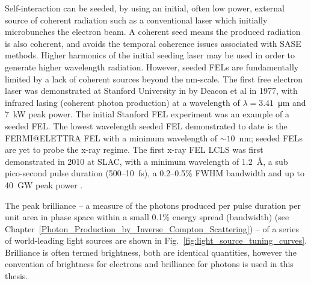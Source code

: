 \documentclass[../main.tex]{subfiles}
\begin{document}
Self-interaction can be seeded, by using an initial, often low power, external source of coherent radiation such as a conventional laser which initially microbunches the electron beam. A coherent seed means the produced radiation is also coherent, and avoids the temporal coherence issues associated with SASE methods. Higher harmonics of the initial seeding laser may be used in order to generate higher wavelength radiation. However, seeded FELs are fundamentally limited by a lack of coherent sources beyond the \si{\nano\meter}-scale. The first free electron laser was demonstrated at Stanford University in by Deacon et al \cite{deacon1977first} in 1977, with infrared lasing (coherent photon production) at a wavelength of $\lambda = 3.41$~\si{\micro\meter} and 7~\si{\kilo\watt} peak power. The initial Stanford FEL experiment was an example of a seeded FEL. The lowest wavelength seeded FEL demonstrated to date is the FERMI@ELETTRA FEL \cite{allaria2012highly} with a minimum wavelength of $\sim10$~\si{\nano\meter}; seeded FELs are yet to probe the x-ray regime. The first x-ray FEL LCLS was first demonstrated in 2010 at SLAC, with a minimum wavelength of 1.2~\si{\angstrom}, a sub pico-second pulse duration (500--10~\si{\femto\second}), a 0.2--0.5\% FWHM bandwidth and up to 40~\si{\giga\watt} peak power \cite{emma2010first}.

The peak brilliance -- a measure of the photons produced per pulse duration per unit area in phase space within a small 0.1\% energy spread (bandwidth) (see Chapter~\ref{Photon_Production_by_Inverse_Compton_Scattering}) -- of a series of world-leading light sources are shown in Fig.~\ref{fig:light_source_tuning_curves}. Brilliance is often termed brightness, both are identical quantities, however the convention of brightness for electrons and brilliance for photons is used in this thesis. 
\end{document}
